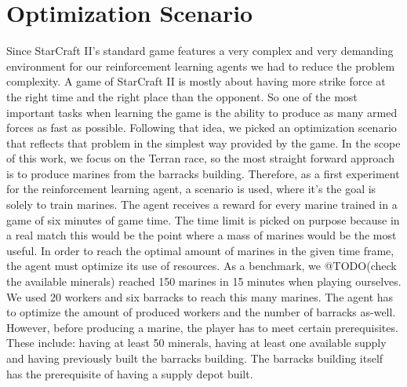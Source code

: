 \documentclass[12pt,a4paper]{article}
\begin{document}
\section{Optimization Scenario}\label{sec:scenario}
Since StarCraft II's standard game features a very complex and very demanding environment for our reinforcement learning agents we had to reduce the problem complexity.
A game of StarCraft II is mostly about having more strike force at the right time and the right place than the opponent.
So one of the most important tasks when learning the game is the ability to produce as many armed forces as fast as possible. Following that idea, we picked an optimization scenario that reflects that problem in the simplest way provided by the game.
In the scope of this work, we focus on the Terran race, so the most straight forward approach is to produce marines from the barracks building.
Therefore, as a first experiment for the reinforcement learning agent, a scenario is used, where it's the goal is solely to train marines.
The agent receives a reward for every marine trained in a game of six minutes of game time. The time limit is picked on purpose because in a real match this would be the point where a mass of marines would be the most useful.
In order to reach the optimal amount of marines in the given time frame, the agent must optimize its use of resources.
As a benchmark, we @TODO(check the available minerals) reached 150 marines in 15 minutes when playing ourselves. We used 20 workers and six barracks to reach this many marines.
The agent has to optimize the amount of produced workers and the number of barracks as-well.
However, before producing a marine, the player has to meet certain prerequisites. These include: having at least 50 minerals, having at least one available supply and having previously built the barracks building. The barracks building itself has the prerequisite of having a supply depot built.
\end{document}
